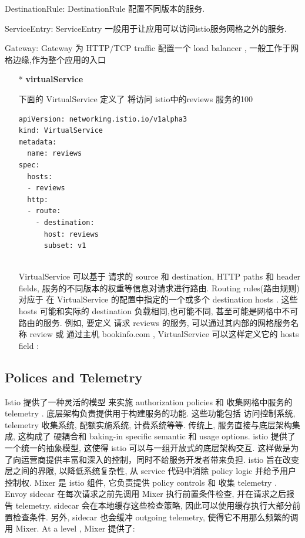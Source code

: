 \documentclass{ctexart}
\begin{document}
DestinationRule: DestinationRule 配置不同版本的服务.

ServiceEntry: ServiceEntry 一般用于让应用可以访问istio服务网格之外的服务.

Gateway: Gateway 为 HTTP/TCP traffic 配置一个 load balancer , 一般工作于网格边缘,作为整个应用的入口

\begin{enumerate}
	\item [*] \textbf{virtualService}
	
	下面的 VirtualService 定义了 将访问 istio中的reviews 服务的100%
\lstset{language=C}
\begin{lstlisting}
apiVersion: networking.istio.io/v1alpha3
kind: VirtualService
metadata:
  name: reviews
spec:
  hosts:
  - reviews
  http:
  - route:
    - destination:
      host: reviews
      subset: v1


\end{lstlisting}

	VirtualService 可以基于 请求的 source 和 destination, HTTP paths 和 header fields, 服务的不同版本的权重等信息对请求进行路由.
	Routing rules(路由规则) 对应于 在 VirtualService 的配置中指定的一个或多个 destination hosts . 这些 hosts 可能和实际的 destination 负载相同,也可能不同, 甚至可能是网格中不可路由的服务.
	例如, 要定义 请求 reviews 的服务, 可以通过其内部的网格服务名称 review 或 通过主机 bookinfo.com , VirtualService 可以这样定义它的 hosts field :
	

	
\end{enumerate}

\subsection{Polices and Telemetry}
Istio 提供了一种灵活的模型 来实施 authorization policies 和 收集网格中服务的 telemetry .
底层架构负责提供用于构建服务的功能.  这些功能包括 访问控制系统, telemetry 收集系统, 配额实施系统, 计费系统等等. 传统上, 服务直接与底层架构集成, 这构成了 硬耦合和 baking-in specific semantic 和 usage options.
istio 提供了一个统一的抽象模型, 这使得 istio 可以与一组开放式的底层架构交互.
这样做是为了向运营商提供丰富和深入的控制，同时不给服务开发者带来负担.
istio 旨在改变层之间的界限, 以降低系统复杂性, 从 service 代码中消除 policy logic 并给予用户控制权.
Mixer 是 istio 组件, 它负责提供 policy controls 和 收集 telemetry .
Envoy sidecar 在每次请求之前先调用 Mixer 执行前置条件检查, 并在请求之后报告 telemetry.
sidecar 会在本地缓存这些检查策略, 因此可以使用缓存执行大部分前置检查条件.
另外, sidecar 也会缓冲 outgoing telemetry, 使得它不用那么频繁的调用 Mixer.
At a level , Mixer 提供了:
\end{document}
